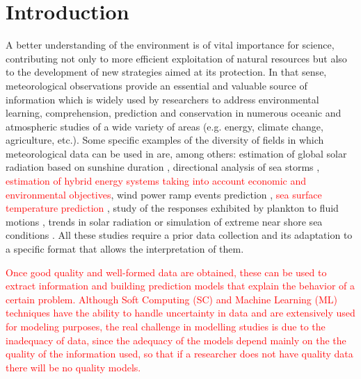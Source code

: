 \documentclass[energies,article,submit,moreauthors,pdftex]{Definitions/mdpi}
\begin{document}


	\section{Introduction}
		
		A better understanding of the environment is of vital importance for science, contributing not only to more efficient exploitation of natural resources but also to the development of new strategies aimed at its protection. In that sense, meteorological observations provide an essential and valuable source of information which is widely used by researchers to address environmental learning, comprehension, prediction and conservation in numerous oceanic and atmospheric studies of a wide variety of areas (e.g. energy, climate change, agriculture, etc.). Some specific examples of the diversity of fields in which meteorological data can be used in are, among others: estimation of global solar radiation based on sunshine duration \cite{SHAHRUKHANIS2019179}, directional analysis of sea storms \cite{LAFACE201545}, \textcolor{red}{estimation of hybrid energy systems taking into account economic and environmental objectives\cite{Kumar2020}}, wind power ramp events prediction \cite{DORADOMORENO2017428}, \textcolor{red}{sea surface temperature prediction \cite{He2020}}, study of the responses exhibited by plankton to fluid motions \cite{FUCHS2016109}, trends in solar radiation \cite{SILVA20101852} or simulation of extreme near shore sea conditions \cite{GOULDBY201415}. All these studies require a prior data collection and its adaptation to a specific format that allows the interpretation of them.
		
		\textcolor{red}{Once good quality and well-formed data are obtained, these can be used to extract information and building prediction models that explain the behavior of a certain problem. Although Soft Computing (SC) and Machine Learning (ML) techniques have the ability to handle uncertainty in data and are extensively used for modeling purposes, the real challenge in modelling studies is due to the inadequacy of data, since the adequacy of the models depend mainly on the the quality of the information used, so that if a researcher does not have quality data there will be no quality models.}
		
\end{document}

